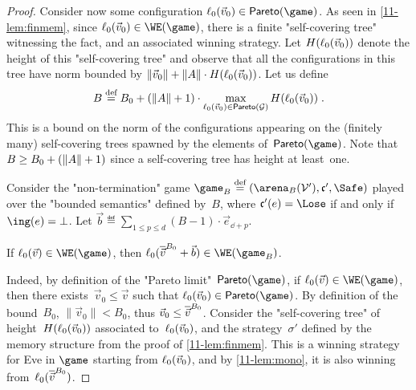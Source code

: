 \begin{proof}

  Consider now some configuration $\loc_0(\vec
  v_0)\in\mathsf{Pareto}(\game)$.  As seen in \cref{11-lem:finmem},
  since $\loc_0(\vec v_0)\in\WE(\game)$, there is a finite
  "self-covering tree" witnessing the fact, and an associated winning
  strategy.  Let $H(\loc_0(\vec v_0))$ denote the height of this
  "self-covering tree" and observe that all the configurations in this
  tree have norm bounded by $\|\vec v_0\|+\|\Act\|\cdot H(\loc_0(\vec
  v_0))$.
  Let us define
  \begin{equation}\label{11-eq:b}
   B\eqdef B_0+(\|\Act\|+1)\cdot \max_{\loc_0(\vec
  v_0)\in\mathsf{Pareto}(\?G)}H(\loc_0(\vec v_0))\;.
  \end{equation}
  This is a bound on the norm of the configurations appearing on the
  (finitely many) self-covering trees spawned by the elements
  of~$\mathsf{Pareto}(\game)$.  Note that $B\geq B_0+(\|\Act\|+1)$ since
  a self-covering tree has height at least~one.

  Consider the "non-termination" game
  $\game_B\eqdef(\bounded(\?V'),\col',\Safe)$ played over the
  "bounded semantics" defined by~$B$, where $\col'(e)=\Lose$ if and
  only if $\ing(e)=\sink$.  Let $\vec b\eqdef\sum_{1\leq p\leq
  d}(B-1)\cdot\vec e_{\dd+p}$.
  {\renewcommand{\qedsymbol}{}
  \begin{claim}\label{11-cl:parity2bounding} If $\loc_0(\vec
    v)\in\WE(\game)$, then
    $\loc_0(\capp[B_0]{v}+\vec b)\in\WE(\game_B)$.
  \end{claim}}
  Indeed, by definition of the "Pareto
  limit"~$\mathsf{Pareto}(\game)$, if $\loc_0(\vec v)\in\WE(\game)$,
  then there exists~$\vec v_0\leq\vec v$ such that $\loc_0(\vec
  v_0)\in\mathsf{Pareto}(\game)$.  By definition of the bound~$B_0$,
  $\|\vec v_0\|<B_0$, thus $\vec v_0\leq\capp[B_0]v$.  Consider the
  "self-covering tree" of height~$H(\loc_0(\vec v_0))$ associated
  to~$\loc_0(\vec v_0)$, and the strategy~$\sigma'$ defined by the
  memory structure from the
  proof of \cref{11-lem:finmem}.  This is a winning strategy for Eve 
  in $\game$ starting from $\loc_0(\vec v_0)$, and
  by \cref{11-lem:mono}, it is also winning
  from~$\loc_0(\capp[B_0]v)$.
    

\end{proof}
